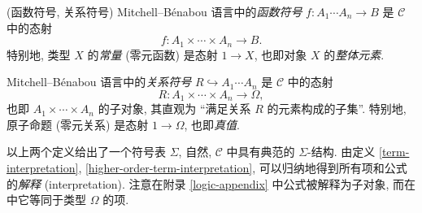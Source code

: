 \begin{definition}
	{(函数符号, 关系符号)}
	Mitchell--B\'enabou 语言中的\emph{函数符号} $f\colon A_1\cdots A_n \to B$ 是 $\mathcal C$ 中的态射
	$$f\colon A_1\times\cdots\times A_n\to B.$$
	特别地, 类型 $X$ 的\emph{常量} (零元函数) 是态射 $1 \to X$, 也即对象 $X$ 的\emph{整体元素}.
	
	Mitchell--B\'enabou 语言中的\emph{关系符号} $R\hookrightarrow A_1\cdots A_n$ 是 $\mathcal C$ 中的态射
	$$
	R\colon A_1\times\cdots\times A_n \to \Omega,
	$$
	也即 $A_1\times\cdots\times A_n$ 的子对象, 其直观为 ``满足关系 $R$ 的元素构成的子集''.
	特别地, 原子命题 (零元关系) 是态射 $1\to\Omega$, 也即\emph{真值}.
	
\end{definition}


以上两个定义给出了一个符号表 $\Sigma$, 自然, $\mathcal C$ 中具有典范的 $\Sigma$-结构.
由定义 \ref{term-interpretation}, \ref{higher-order-term-interpretation}, 可以归纳地得到所有项和公式的\emph{解释} (interpretation).
注意在附录 \ref{logic-appendix} 中公式被解释为子对象, 而在\topos{}中它等同于类型 $\Omega$ 的项.

%    


%	



